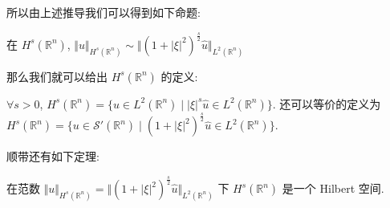 \documentclass[11pt]{ctexart}[UTF8]
\begin{document}
所以由上述推导我们可以得到如下命题:
\begin{proposition}
    在 $H^{s}(\mathbb{R}^{n})$, $\Vert u \Vert_{H^{s}(\mathbb{R}^{n})} \sim \Vert (1+|\xi|^{2})^{\frac{s}{2}}\widehat{u} \Vert_{L^{2}(\mathbb{R}^{n})}$
\end{proposition}
那么我们就可以给出 $H^s(\mathbb{R}^n)$ 的定义:
\begin{definition}
    $\forall s>0$, $H^s(\mathbb{R}^n) = \{ u \in L^2(\mathbb{R}^n) \mid |\xi|^{s}\widehat{u} \in L^2(\mathbb{R}^n) \}$. 
    还可以等价的定义为 $H^s(\mathbb{R}^n) = \{ u \in \mathscr{S}'(\mathbb{R}^n) \mid (1+|\xi|^2)^{\frac{s}{2}}\widehat{u} \in L^2(\mathbb{R}^n) \}$.
\end{definition}
顺带还有如下定理:
\begin{theorem}
    在范数 $\Vert u \Vert_{H^{s}(\mathbb{R}^{n})} = \Vert (1+|\xi|^{2})^{\frac{s}{2}}\widehat{u} \Vert_{L^{2}(\mathbb{R}^{n})}$ 下 $H^{s}(\mathbb{R}^{n})$ 是一个 Hilbert 空间.
\end{theorem}
\end{document}
